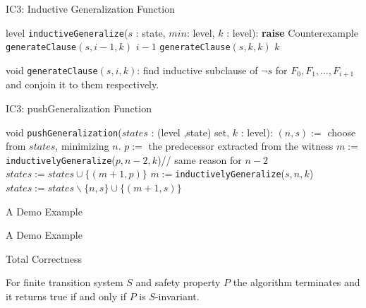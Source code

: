 \documentclass[aspectratio=1610, 13pt]{beamer}
\begin{document}
\begin{frame}{IC3: Inductive Generalization Function}

\begin{algorithmic}[1]
\STATE level \texttt{inductiveGeneralize}($s$ : state, $min$: level, $k$ : level):
\STATE \textbf{raise} Counterexample
\ENDIF
{}
\STATE \texttt{generateClause}$(s, i-1, k)$
\RETURN $i - 1$
\ENDIF
\ENDFOR
\STATE \texttt{generateClause}$(s, k, k)$
\RETURN $k$
\end{algorithmic}
\begin{algorithmic}[1]
\STATE void \texttt{generateClause}$(s, i, k)$: find inductive subclause of $\neg s$ for $F_0, F_1, \ldots, F_{i + 1}$ and conjoin it to them respectively.
\end{algorithmic}
\end{frame}

\begin{frame}{IC3: pushGeneralization Function}
\begin{algorithmic}[1]
\STATE void \texttt{pushGeneralization}($states$ : (level ,state) set,  $k$ : level):
	\STATE $(n, s) := $ choose from $states$, minimizing $n$.
		\RETURN
	\ENDIF
		\STATE $p := $ the predecessor extracted from the witness
		\STATE $m := $\texttt{inductivelyGeneralize}($p, n-2, k$)// same reason for $n-2$
		\STATE $states := states \cup \{(m + 1, p)\}$
	\ELSE
		\STATE $m := $\texttt{inductivelyGeneralize}($s, n, k$)
		\STATE $states := states\backslash\{n, s\} \cup \{(m + 1, s)\}$
	\ENDIF

\ENDWHILE
\end{algorithmic}
\end{frame}

\begin{frame}{A Demo Example}

\end{frame}
\begin{frame}{A Demo Example}

\end{frame}

\begin{frame}{Total Correctness}
\begin{theorem}
For finite transition system $S$ and safety property $P$ the algorithm terminates and it returns true if and only if $P$ is $S$-invariant.
\end{theorem}
\end{frame}
\end{document}
